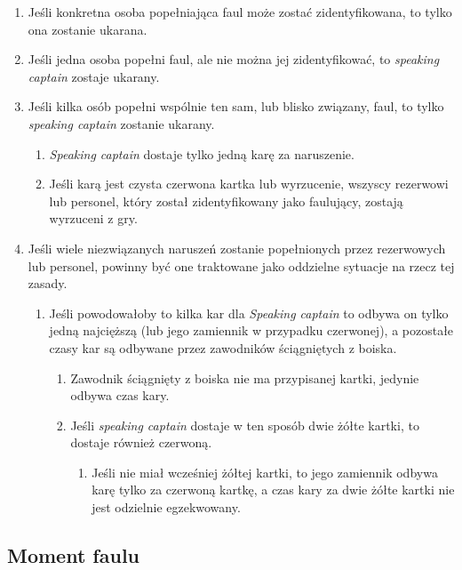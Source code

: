 \documentclass[11pt,a4paper]{article}
\begin{document}
\begin{enumerate}
  \item Jeśli konkretna osoba popełniająca faul może zostać zidentyfikowana, to tylko ona zostanie ukarana.
  \item Jeśli jedna osoba popełni faul, ale nie można jej zidentyfikować, to \emph{speaking captain} zostaje ukarany.
  \item Jeśli kilka osób popełni wspólnie ten sam, lub blisko związany, faul, to tylko \emph{speaking captain} zostanie ukarany.
  \begin{enumerate}
    \item \emph{Speaking captain} dostaje tylko jedną karę za naruszenie.
    \item Jeśli karą jest czysta czerwona kartka lub wyrzucenie, wszyscy rezerwowi lub personel, który został zidentyfikowany jako faulujący, zostają wyrzuceni z gry.
  \end{enumerate}
  \item Jeśli wiele niezwiązanych naruszeń zostanie popełnionych przez rezerwowych lub personel, powinny być one traktowane jako oddzielne sytuacje na rzecz tej zasady.
  \begin{enumerate}
    \item Jeśli powodowałoby to kilka kar dla \emph{Speaking captain} to odbywa on tylko jedną najcięższą (lub jego zamiennik w przypadku czerwonej), a pozostałe czasy kar są odbywane przez zawodników ściągniętych z boiska.
    \begin{enumerate}
      \item Zawodnik ściągnięty z boiska nie ma przypisanej kartki, jedynie odbywa czas kary.
      \item Jeśli \emph{speaking captain} dostaje w ten sposób dwie żółte kartki, to dostaje również czerwoną.
      \begin{enumerate}
        \item Jeśli nie miał wcześniej żółtej kartki, to jego zamiennik odbywa karę tylko za czerwoną kartkę, a czas kary za dwie żółte kartki nie jest odzielnie egzekwowany.
      \end{enumerate}
    \end{enumerate}
  \end{enumerate}
\end{enumerate}

\subsection{Moment faulu}
\end{document}
